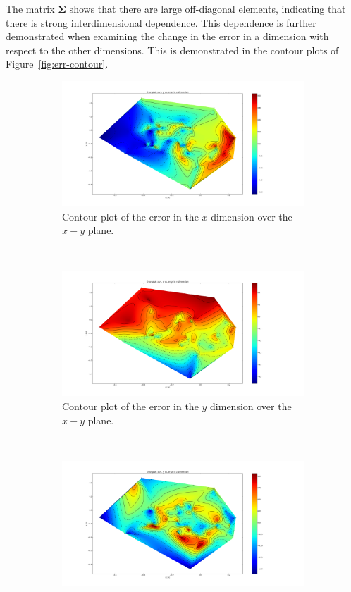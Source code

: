 The matrix $\bm{\Sigma}$ shows that there are large off-diagonal elements, indicating that there is strong interdimensional dependence. This dependence is further demonstrated when examining the change in the error in a dimension with respect to the other dimensions. This is demonstrated in the contour plots of Figure~\ref{fig:err-contour}. 

\begin{figure}
  \centering
  \begin{subfigure}{0.31\textwidth}
    \includegraphics[clip, trim = 200 50 300 50, width=\textwidth]{figures/chapter3/contour_x}
    \caption{Contour plot of the error in the $x$ dimension over the $x-y$ plane.}
  \end{subfigure}
~
  \begin{subfigure}{0.31\textwidth}
    \includegraphics[clip, trim = 200 50 300 50, width=\textwidth]{figures/chapter3/contour_y}
    \caption{Contour plot of the error in the $y$ dimension over the $x-y$ plane.}
  \end{subfigure}
~
  \begin{subfigure}{0.31\textwidth}
    \includegraphics[clip, trim = 200 50 300 50, width=\textwidth]{figures/chapter3/contour_z}

\end{subfigure}
\end{figure}
